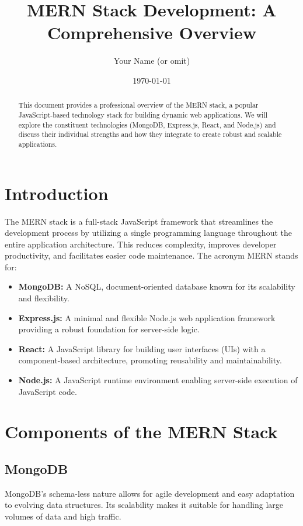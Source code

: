 \documentclass{article}
\title{MERN Stack Development: A Comprehensive Overview}
\author{Your Name (or omit)}
\date{\today}
\begin{document}
\maketitle

\begin{abstract}
This document provides a professional overview of the MERN stack, a popular JavaScript-based technology stack for building dynamic web applications.  We will explore the constituent technologies (MongoDB, Express.js, React, and Node.js) and discuss their individual strengths and how they integrate to create robust and scalable applications.
\end{abstract}

\section{Introduction}

The MERN stack is a full-stack JavaScript framework that streamlines the development process by utilizing a single programming language throughout the entire application architecture.  This reduces complexity, improves developer productivity, and facilitates easier code maintenance.  The acronym MERN stands for:

\begin{itemize}
    \item \textbf{MongoDB:} A NoSQL, document-oriented database known for its scalability and flexibility.
    \item \textbf{Express.js:} A minimal and flexible Node.js web application framework providing a robust foundation for server-side logic.
    \item \textbf{React:} A JavaScript library for building user interfaces (UIs) with a component-based architecture, promoting reusability and maintainability.
    \item \textbf{Node.js:} A JavaScript runtime environment enabling server-side execution of JavaScript code.
\end{itemize}


\section{Components of the MERN Stack}

\subsection{MongoDB}
MongoDB's schema-less nature allows for agile development and easy adaptation to evolving data structures. Its scalability makes it suitable for handling large volumes of data and high traffic.
\end{document}
